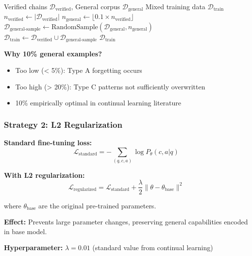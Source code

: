 \documentclass[12pt,a4paper]{article}
\theoremstyle{definition}
\begin{document}
\begin{algorithm}[htbp]
\caption{Mixed Training Data Construction}
\begin{algorithmic}[1]
\Require Verified chains $\mathcal{D}_{\text{verified}}$, General corpus $\mathcal{D}_{\text{general}}$
\Ensure Mixed training data $\mathcal{D}_{\text{train}}$
\State
\State $n_{\text{verified}} \gets |\mathcal{D}_{\text{verified}}|$
\State $n_{\text{general}} \gets \lfloor 0.1 \times n_{\text{verified}} \rfloor$ 
\State
\State $\mathcal{D}_{\text{general-sample}} \gets \text{RandomSample}(\mathcal{D}_{\text{general}}, n_{\text{general}})$
\State $\mathcal{D}_{\text{train}} \gets \mathcal{D}_{\text{verified}} \cup \mathcal{D}_{\text{general-sample}}$
\State
\State \Return $\mathcal{D}_{\text{train}}$ 
\end{algorithmic}
\end{algorithm}

\textbf{Why 10\% general examples?}
\begin{itemize}
    \item Too low (< 5\%): Type A forgetting occurs
    \item Too high (> 20\%): Type C patterns not sufficiently overwritten
    \item 10\% empirically optimal in continual learning literature
\end{itemize}

\subsubsection{Strategy 2: L2 Regularization}

\textbf{Standard fine-tuning loss:}
\begin{equation}
\mathcal{L}_{\text{standard}} = -\sum_{(q,c,a)} \log P_\theta(c, a | q)
\end{equation}

\textbf{With L2 regularization:}
\begin{equation}
\mathcal{L}_{\text{regularized}} = \mathcal{L}_{\text{standard}} + \frac{\lambda}{2} \|\theta - \theta_{\text{base}}\|^2
\end{equation}

where $\theta_{\text{base}}$ are the original pre-trained parameters.

\textbf{Effect:} Prevents large parameter changes, preserving general capabilities encoded in base model.

\textbf{Hyperparameter:} $\lambda = 0.01$ (standard value from continual learning)
\end{document}
